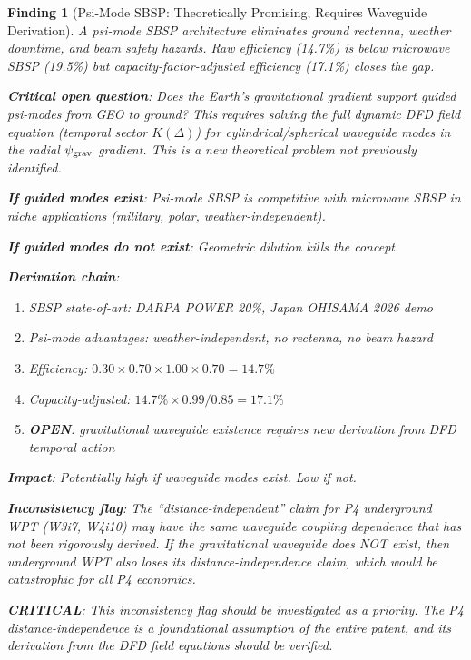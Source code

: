 \documentclass[11pt]{article}
\newtheorem{finding}{Finding}
\newcommand{\psigrav}{\psi_{\rm grav}}
\begin{document}
\begin{finding}[Psi-Mode SBSP: Theoretically Promising, Requires Waveguide
  Derivation]
\label{find:psi-SBSP}
A psi-mode SBSP architecture eliminates ground rectenna, weather downtime,
and beam safety hazards. Raw efficiency (14.7\%) is below microwave SBSP
(19.5\%) but capacity-factor-adjusted efficiency (17.1\%) closes the gap.

\textbf{Critical open question}: Does the Earth's gravitational gradient
support guided psi-modes from GEO to ground? This requires solving the
full dynamic DFD field equation (temporal sector $K(\Delta)$) for
cylindrical/spherical waveguide modes in the radial $\psigrav$ gradient.
This is a new theoretical problem not previously identified.

\textbf{If guided modes exist}: Psi-mode SBSP is competitive with microwave
SBSP in niche applications (military, polar, weather-independent).

\textbf{If guided modes do not exist}: Geometric dilution kills the concept.

\textbf{Derivation chain}:
\begin{enumerate}[nosep]
\item SBSP state-of-art: DARPA POWER 20\%, Japan OHISAMA 2026 demo
\item Psi-mode advantages: weather-independent, no rectenna, no beam hazard
\item Efficiency: $0.30 \times 0.70 \times 1.00 \times 0.70 = 14.7\%$
\item Capacity-adjusted: $14.7\% \times 0.99/0.85 = 17.1\%$
\item \textbf{OPEN}: gravitational waveguide existence requires new
  derivation from DFD temporal action
\end{enumerate}

\textbf{Impact}: Potentially high if waveguide modes exist. Low if not.

\textbf{Inconsistency flag}: The ``distance-independent'' claim for P4
underground WPT (W3i7, W4i10) may have the same waveguide coupling
dependence that has not been rigorously derived. If the gravitational
waveguide does NOT exist, then underground WPT also loses its
distance-independence claim, which would be catastrophic for all P4
economics.

\textbf{CRITICAL}: This inconsistency flag should be investigated as a
priority. The P4 distance-independence is a \emph{foundational assumption}
of the entire patent, and its derivation from the DFD field equations
should be verified.
\end{finding}
\end{document}
